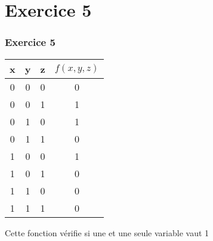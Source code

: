 \documentclass[svgnames,11pt]{beamer}
\begin{document}
\section{Exercice 5}
\begin{frame}
    \frametitle{Exercice 5}

    \begin{center}
        \begin{tabular}{|*4{c|}}
            \hline
            x & y & z & $f(x,y,z)$ \\
            \hline
            0 & 0 & 0 & 0          \\
            \hline
            0 & 0 & 1 & 1          \\
            \hline
            0 & 1 & 0 & 1          \\
            \hline
            0 & 1 & 1 & 0          \\
            \hline
            1 & 0 & 0 & 1          \\
            \hline
            1 & 0 & 1 & 0          \\
            \hline
            1 & 1 & 0 & 0          \\
            \hline
            1 & 1 & 1 & 0          \\
            \hline
        \end{tabular}
    \end{center}
    Cette fonction vérifie si une et une seule variable vaut 1
\end{frame}
\end{document}
